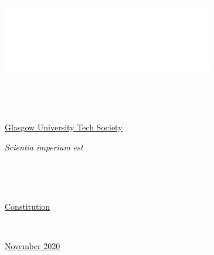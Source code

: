\documentclass[a4paper]{article}
\begin{document}
\begin{center} \includegraphics[height=3cm,decodearray={1 0 0 0 0 0}]{media/gutslogo.png} \end{center}
\hspace*{0.333em}

~

~

\begin{center} \Huge{\underline{Glasgow University Tech Society}} \end{center}

\begin{center} \huge{\textit{Scientia imperium est}} \end{center}

~

~

\begin{center} \huge{\underline{Constitution}} \end{center}

~

\begin{center} \huge{\underline{November 2020}} \end{center}

\newpage



\newpage



\newpage



~
\end{document}
